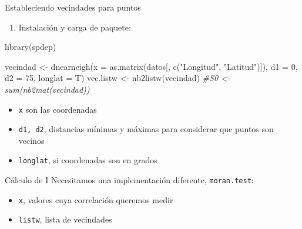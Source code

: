 \documentclass[
  11pt,
  ignorenonframetext,
]{beamer}
\newenvironment{Shaded}{}{}
\newcommand{\AttributeTok}[1]{\textcolor[rgb]{0.49,0.56,0.16}{#1}}
\newcommand{\CommentTok}[1]{\textcolor[rgb]{0.38,0.63,0.69}{\textit{#1}}}
\newcommand{\DecValTok}[1]{\textcolor[rgb]{0.25,0.63,0.44}{#1}}
\newcommand{\FunctionTok}[1]{\textcolor[rgb]{0.02,0.16,0.49}{#1}}
\newcommand{\NormalTok}[1]{#1}
\newcommand{\OtherTok}[1]{\textcolor[rgb]{0.00,0.44,0.13}{#1}}
\newcommand{\SpecialCharTok}[1]{\textcolor[rgb]{0.25,0.44,0.63}{#1}}
\newcommand{\StringTok}[1]{\textcolor[rgb]{0.25,0.44,0.63}{#1}}
\providecommand{\tightlist}{%
  \setlength{\itemsep}{0pt}\setlength{\parskip}{0pt}}
\begin{document}
\begin{frame}[fragile]{Estableciendo vecindades para puntos}
\protect\hypertarget{estableciendo-vecindades-para-puntos}{}
\begin{enumerate}
\tightlist
\item
  Instalación y carga de paquete:
\end{enumerate}

\begin{Shaded}
\begin{Highlighting}[]
\FunctionTok{library}\NormalTok{(spdep)}
\end{Highlighting}
\end{Shaded}

\begin{Shaded}
\begin{Highlighting}[]
\NormalTok{vecindad }\OtherTok{\textless{}{-}} \FunctionTok{dnearneigh}\NormalTok{(}\AttributeTok{x =} \FunctionTok{as.matrix}\NormalTok{(datos[, }\FunctionTok{c}\NormalTok{(}\StringTok{"Longitud"}\NormalTok{, }\StringTok{"Latitud"}\NormalTok{)]), }\AttributeTok{d1 =} \DecValTok{0}\NormalTok{, }\AttributeTok{d2 =} \DecValTok{75}\NormalTok{, }\AttributeTok{longlat =}\NormalTok{ T)}
\NormalTok{vec.listw }\OtherTok{\textless{}{-}} \FunctionTok{nb2listw}\NormalTok{(vecindad)}
\CommentTok{\#S0 \textless{}{-} sum(nb2mat(vecindad))}
\end{Highlighting}
\end{Shaded}

\begin{itemize}
\tightlist
\item
  \texttt{x} son las coordenadas
\item
  \texttt{d1,\ d2}, distancias mínimas y máximas para considerar que
  puntos son vecinos
\item
  \texttt{longlat}, si coordenadas son en grados
\end{itemize}
\end{frame}

\begin{frame}[fragile]{Cálculo de I}
\protect\hypertarget{cuxe1lculo-de-i}{}
Necesitamos una implementación diferente, \texttt{moran.test}:

\begin{Shaded}
\end{Shaded}

\begin{itemize}
\item
  \texttt{x}, valores cuya correlación queremos medir
\item
  \texttt{listw}, lista de vecindades
\end{itemize}
\end{frame}
\end{document}

